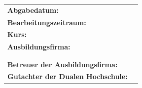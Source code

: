 \begin{titlepage}
\begin{center}
\end{center}

\begin{center}
	\vfill
	\begin{tabular}{ll}
		\textbf{Abgabedatum:}                     & \abgabe \\[0.2cm]
		\textbf{Bearbeitungszeitraum:}            & \bearbeitungszeitraum \\[0.2cm]
		\textbf{Kurs:}            				  & \kurs \\[0.2cm]
		\textbf{Ausbildungsfirma:}                & \firmaName \\
		                                 		  & \firmaStrasse \\
		                                          & \firmaPlz \\[0.2cm]
		\textbf{Betreuer der Ausbildungsfirma:}   & \betreuerFirma \\[0.2cm]
		\textbf{Gutachter der Dualen Hochschule:} & \betreuerDhbw \\[2cm]
	\end{tabular} 
\end{center}
\end{titlepage}
